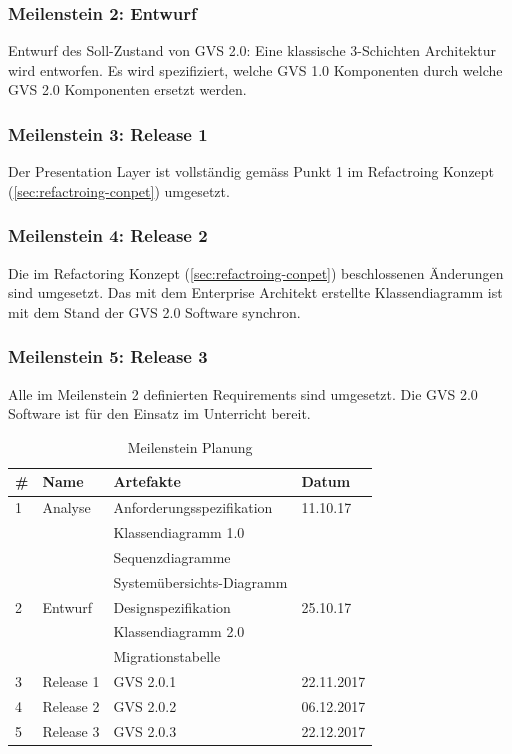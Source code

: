 \documentclass[11pt,a4paper,english,oneside]{book}
\numberwithin{equation}{chapter}
\begin{document}
	\subsubsection{Meilenstein 2: Entwurf}
	\label{milestone2}
	Entwurf des Soll-Zustand von GVS 2.0: Eine klassische 3-Schichten Architektur wird entworfen. Es wird spezifiziert, welche GVS 1.0 Komponenten durch welche GVS 2.0 Komponenten ersetzt werden. 
	
	\subsubsection{Meilenstein 3: Release 1}
	Der Presentation Layer ist vollständig gemäss Punkt 1 im Refactroing Konzept (\ref{sec:refactroing-conpet}) umgesetzt.
	
	\subsubsection{Meilenstein 4: Release 2}
	Die im Refactoring Konzept (\ref{sec:refactroing-conpet}) beschlossenen Änderungen sind umgesetzt. Das mit dem Enterprise Architekt erstellte Klassendiagramm ist mit dem Stand der GVS 2.0 Software synchron.
	
	\subsubsection{Meilenstein 5: Release 3}
	Alle im Meilenstein 2 definierten Requirements sind umgesetzt. Die GVS 2.0 Software ist für den Einsatz im Unterricht bereit.
	
	\begin{table}[h!]
		\centering
		\begin{tabular}{l l l l}
			\toprule 
			\# & Name & Artefakte & Datum \\
			\toprule 
			1 & Analyse & Anforderungsspezifikation & 11.10.17 \\
			& & Klassendiagramm 1.0 & \\
			& & Sequenzdiagramme & \\
			& &  Systemübersichts-Diagramm & \\
			\midrule
			2 & Entwurf  & Designspezifikation & 25.10.17\\
			& & Klassendiagramm 2.0 & \\
			& & Migrationstabelle & \\
			\midrule
			3 & Release 1 & GVS 2.0.1 & 22.11.2017 \\
			\midrule
			4 & Release 2 & GVS 2.0.2 & 06.12.2017 \\
			\midrule
			5 & Release 3 & GVS 2.0.3 & 22.12.2017 \\
			\bottomrule 
		\end{tabular} 
		\caption{Meilenstein Planung} 
	\end{table}
	
\end{document}
